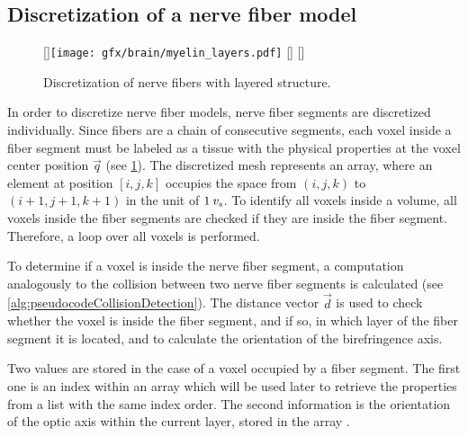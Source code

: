 \subsection{Discretization of a nerve fiber model}
%
\begin{figure}[!t]
\centering
\setlength{\tikzwidth}{0.3\textwidth}
[\tikzwidth]{\texttt{[image: gfx/brain/myelin\_layers.pdf]}\vspace{0mm}}\hfill
{}
[\tikzwidth]{\vspace{-5mm}}\hfill
{}
[\tikzwidth]{\vspace{-5mm}}
\caption{Discretization of nerve fibers with layered structure.}
\label{fig:fiber_discretization}
\end{figure}
%
In order to discretize nerve fiber models, nerve fiber segments are discretized individually.
Since fibers are a chain of consecutive segments, each voxel inside a fiber segment must be labeled as a tissue with the physical properties at the voxel center position $\vec{q}$ (see \cref{fig:fiber_discretization}).
The discretized mesh represents an array, where an element at position $[i,j,k]$ occupies the space from $(i,j,k)$ to $(i+1,j+1,k+1)$ in the unit of $\SI{1}{\textnormal{$\mathit{v_{s}}$}}$.
To identify all voxels inside a volume, all voxels inside the fiber segments are checked if they are inside the fiber segment.
Therefore, a loop over all voxels is performed.
\par
%
To determine if a voxel is inside the nerve fiber segment,
a computation analogously to the collision between two nerve fiber segments is calculated (see \cref{alg:pseudocodeCollisionDetection}).
The distance vector $\vec{d}$ is used to check whether the voxel is inside the fiber segment, and if so, in which layer of the fiber segment it is located, and to calculate the orientation of the birefringence axis.
\par
%
Two values are stored in the case of a voxel occupied by a fiber segment. 
The first one is an index within an array  which will be used later to retrieve the properties from a list with the same index order.
The second information is the orientation of the optic axis within the current layer, stored in the array .
